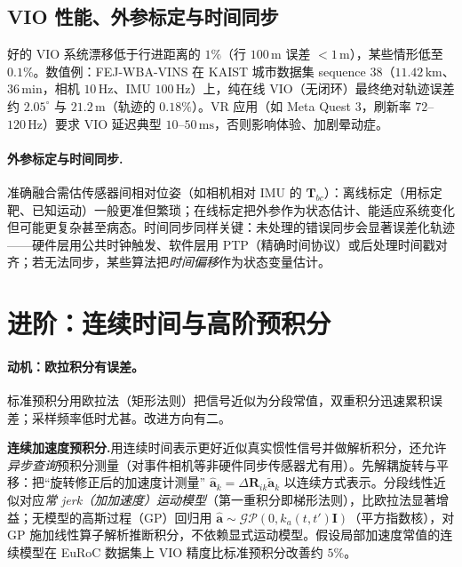\subsection{VIO 性能、外参标定与时间同步}
\label{subsec:vio-practical}

好的 VIO 系统漂移低于行进距离的 $1\%$（行 $100\,\mathrm m$ 误差 $<1\,\mathrm m$），某些情形低至 $0.1\%$\cite{carlone2026handbook}。数值例：FEJ-WBA-VINS 在 KAIST 城市数据集 sequence 38（$11.42\,\mathrm{km}$、$36\,\mathrm{min}$，相机 $10\,\mathrm{Hz}$、IMU $100\,\mathrm{Hz}$）上，纯在线 VIO（无闭环）最终绝对轨迹误差约 $2.05^\circ$ 与 $21.2\,\mathrm m$（轨迹的 $0.18\%$）。VR 应用（如 Meta Quest 3，刷新率 $72$--$120\,\mathrm{Hz}$）要求 VIO 延迟典型 $10$--$50\,\mathrm{ms}$，否则影响体验、加剧晕动症\cite{carlone2026handbook}。

\paragraph{外参标定与时间同步.}
准确融合需估传感器间相对位姿（如相机相对 IMU 的 $\mathbf T_{bc}$）：离线标定（用标定靶、已知运动）一般更准但繁琐；在线标定把外参作为状态估计、能适应系统变化但可能更复杂甚至病态。时间同步同样关键：未处理的错误同步会显著误差化轨迹——硬件层用公共时钟触发、软件层用 PTP（精确时间协议）或后处理时间戳对齐；若无法同步，某些算法把\emph{时间偏移}作为状态变量估计\cite{carlone2026handbook}。

\section{进阶：连续时间与高阶预积分}
\label{sec:imu-advanced}

\paragraph{动机：欧拉积分有误差。}
标准预积分用欧拉法（矩形法则）把信号近似为分段常值，双重积分迅速累积误差；采样频率低时尤甚\cite{carlone2026handbook}。改进方向有二。

\textbf{连续加速度预积分.}\;用连续时间表示更好近似真实惯性信号并做解析积分，还允许\emph{异步查询}预积分测量（对事件相机等非硬件同步传感器尤有用）。先解耦旋转与平移：把“旋转修正后的加速度计测量” $\hat{\mathbf a}_k=\Delta\mathbf R_{ik}\tilde{\mathbf a}_k$ 以连续方式表示。分段线性近似对应\emph{常 jerk（加加速度）运动模型}（第一重积分即梯形法则），比欧拉法显著增益；无模型的高斯过程（GP）回归用 $\hat{\mathbf a}\sim\mathcal{GP}(0,k_a(t,t')\mathbf I)$（平方指数核），对 GP 施加线性算子解析推断积分，不依赖显式运动模型。假设局部加速度常值的连续模型在 EuRoC 数据集上 VIO 精度比标准预积分改善约 $5\%$\cite{carlone2026handbook}。

